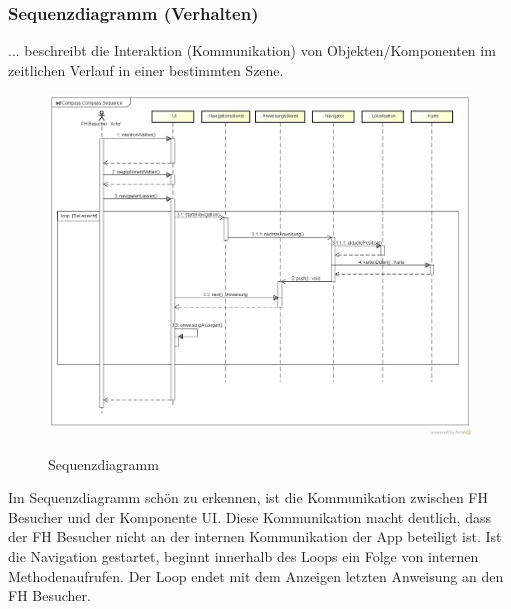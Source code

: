\subsubsection*{Sequenzdiagramm (Verhalten)}
... beschreibt die Interaktion (Kommunikation) von Objekten/Komponenten im zeitlichen Verlauf in einer bestimmten Szene.

\begin{figure}[hbt]
  \centering
  \includegraphics[width=\linewidth]{img/sequenzdiagramm.png}
  \label{img:sequenzdiagramm}
  \caption{Sequenzdiagramm}
\end{figure}

\noindent Im Sequenzdiagramm schön zu erkennen, ist die Kommunikation zwischen FH Besucher und der Komponente UI. Diese Kommunikation macht deutlich, dass der FH Besucher nicht an der internen Kommunikation der App beteiligt ist. Ist die Navigation gestartet, beginnt innerhalb des Loops ein Folge von internen Methodenaufrufen. Der Loop endet mit dem Anzeigen letzten Anweisung an den FH Besucher.